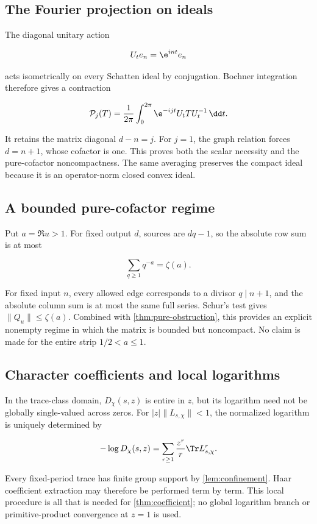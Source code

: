 \subsection{The Fourier projection on ideals}

The diagonal unitary action

\[
 U_te_n=\e^{int}e_n
\]

acts isometrically on every Schatten ideal by conjugation.  Bochner
integration therefore gives a contraction

\[
 \mathcal P_j(T)=\frac1{2\pi}\int_0^{2\pi}
 \e^{-ijt}U_tTU_t^{-1}\,\dd t.
\]

It retains the matrix diagonal \(d-n=j\).  For \(j=1\), the graph relation
forces \(d=n+1\), whose cofactor is one.  This proves both the scalar
necessity and the pure-cofactor noncompactness.  The same averaging preserves
the compact ideal because it is an operator-norm closed convex ideal.

\subsection{A bounded pure-cofactor regime}

Put \(a=\Re u>1\).  For fixed output \(d\), sources are \(dq-1\), so the
absolute row sum is at most

\[
 \sum_{q\ge1}q^{-a}=\zeta(a).
\]

For fixed input \(n\), every allowed edge corresponds to a divisor
\(q\mid n+1\), and the absolute column sum is at most the same full series.
Schur's test gives \(\|Q_u\|\le\zeta(a)\).  Combined with
\cref{thm:pure-obstruction}, this provides an explicit nonempty regime in
which the matrix is bounded but noncompact.  No claim is made for the entire
strip \(1/2<a\le1\).

\subsection{Character coefficients and local logarithms}

In the trace-class domain, \(D_\chi(s,z)\) is entire in \(z\), but its
logarithm need not be globally single-valued across zeros.  For
\(|z|\|L_{s,\chi}\|<1\), the normalized logarithm is uniquely determined by

\[
 -\log D_\chi(s,z)=
 \sum_{r\ge1}\frac{z^r}{r}\Tr L_{s,\chi}^r.
\]

Every fixed-period trace has finite group support by
\cref{lem:confinement}.  Haar coefficient extraction may therefore be
performed term by term.  This local procedure is all that is needed for
\cref{thm:coefficient}; no global logarithm branch or primitive-product
convergence at \(z=1\) is used.

